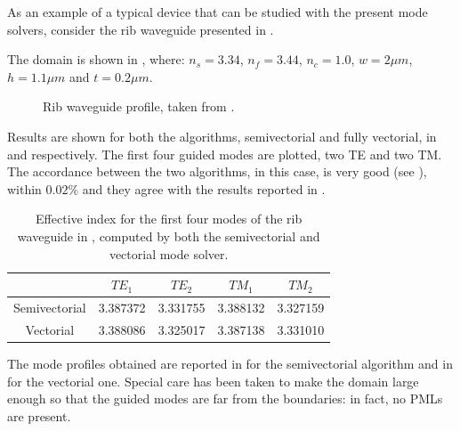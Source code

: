 As an example of a typical device that can be studied with the present
mode solvers, consider the rib waveguide presented in \cite{lohmeyer_wmm}.

The domain is shown in , where: $n_s = 3.34$, $n_f =
3.44$, $n_c = 1.0$, $w = 2 \mu m$, $h = 1.1 \mu m$ and $t = 0.2 \mu m$.

\begin{figure}[htbp]
  \begin{center}
    \resizebox{4cm}{!}{}
  \end{center}
  \caption{Rib waveguide profile, taken from \cite{lohmeyer_wmm}.}
  \label{fig:rib}
\end{figure}

Results are shown for both the algorithms, semivectorial and fully
vectorial, in  and 
respectively. The first four guided modes are plotted, two TE and two
TM. The accordance between the two algorithms, in this case, is very
good (see ), within $0.02\%$ and they agree with the
results reported in \cite{lohmeyer_wmm}.

\begin{table}[htbp]
  \begin{center}
    \begin{tabular}{|*{5}{c|}}
      \hline
      & $TE_1$ & $TE_2$ & $TM_1$ & $TM_2$ \\
      \hline
      Semivectorial & 3.387372 & 3.331755 & 3.388132 & 3.327159 \\
      Vectorial & 3.388086 & 3.325017 & 3.387138 & 3.331010 \\
      \hline
    \end{tabular}
  \end{center}
  \caption{Effective index for the first four modes of the rib
    waveguide in , computed by both the semivectorial
    and vectorial mode solver.}
  \label{tab:wmm1}
\end{table}

The mode profiles obtained are reported in  for
the semivectorial algorithm and in  for the
vectorial one. Special care has been taken to make the domain large
enough so that the guided modes are far from the boundaries: in fact,
no PMLs are present.

